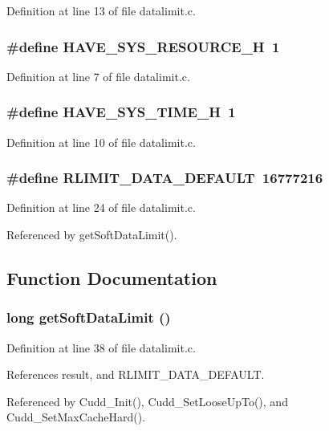 Definition at line 13 of file datalimit.c.
\subsubsection{\setlength{\rightskip}{0pt plus 5cm}\#define HAVE\_\-SYS\_\-RESOURCE\_\-H~1}\label{datalimit_8c_6e7be09e66bc8d1260031bde86fef17b}




Definition at line 7 of file datalimit.c.
\subsubsection{\setlength{\rightskip}{0pt plus 5cm}\#define HAVE\_\-SYS\_\-TIME\_\-H~1}\label{datalimit_8c_2aae46056558e9d6fef6380f9678ffe3}




Definition at line 10 of file datalimit.c.
\subsubsection{\setlength{\rightskip}{0pt plus 5cm}\#define RLIMIT\_\-DATA\_\-DEFAULT~16777216}\label{datalimit_8c_078d50c5bc23076e0d2af8d96156aeae}




Definition at line 24 of file datalimit.c.

Referenced by get\-Soft\-Data\-Limit().

\subsection{Function Documentation}
\subsubsection{\setlength{\rightskip}{0pt plus 5cm}long get\-Soft\-Data\-Limit ()}\label{datalimit_8c_611a4cb94096a6fd4e4f6b9e3189f2fd}




Definition at line 38 of file datalimit.c.

References result, and RLIMIT\_\-DATA\_\-DEFAULT.

Referenced by Cudd\_\-Init(), Cudd\_\-Set\-Loose\-Up\-To(), and Cudd\_\-Set\-Max\-Cache\-Hard().